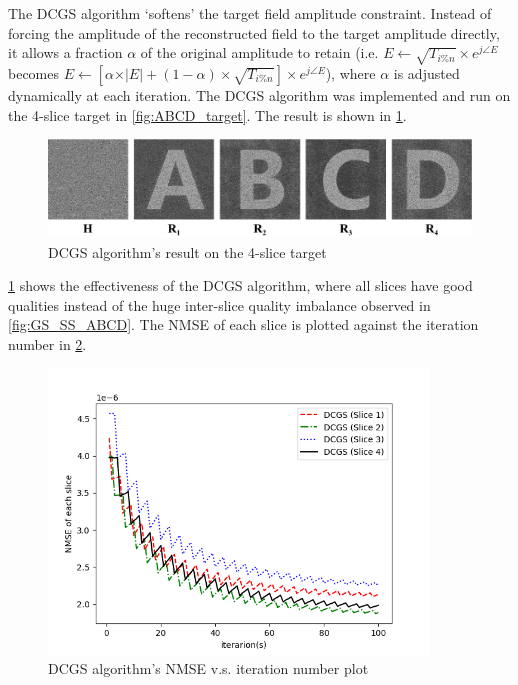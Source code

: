 The DCGS algorithm `softens' the target field amplitude constraint. Instead of forcing the amplitude of the reconstructed field to the target amplitude directly, it allows a fraction $\alpha$ of the original amplitude to retain (i.e. $E \gets \sqrt{T_{i\%n}} \times e^{j\angle E}$ becomes $E \gets [\alpha \times \vert E \vert + (1-\alpha) \times \sqrt{T_{i\%n}}] \times e^{j\angle E}$), where $\alpha$ is adjusted dynamically at each iteration. The DCGS algorithm was implemented and run on the 4-slice target in \cref{fig:ABCD_target}. The result is shown in \cref{fig:DCGS_ABCD}.

\begin{figure}[H]
  \centering
  \includegraphics[width=1.0\textwidth]{ABCD/DCGS_ABCD.pdf}
  \caption{DCGS algorithm's result on the 4-slice target}
  \label{fig:DCGS_ABCD}
\end{figure}

\cref{fig:DCGS_ABCD} shows the effectiveness of the DCGS algorithm, where all slices have good qualities instead of the huge inter-slice quality imbalance observed in \cref{fig:GS_SS_ABCD}. The NMSE of each slice is plotted against the iteration number in \cref{fig:Each_slice_DCGS}.

\begin{figure}[H]
  \centering
  \includegraphics[width=0.9\textwidth]{ABCD/Each_slice_DCGS.png}
  \caption{DCGS algorithm's NMSE v.s. iteration number plot}
  \label{fig:Each_slice_DCGS}
\end{figure}

